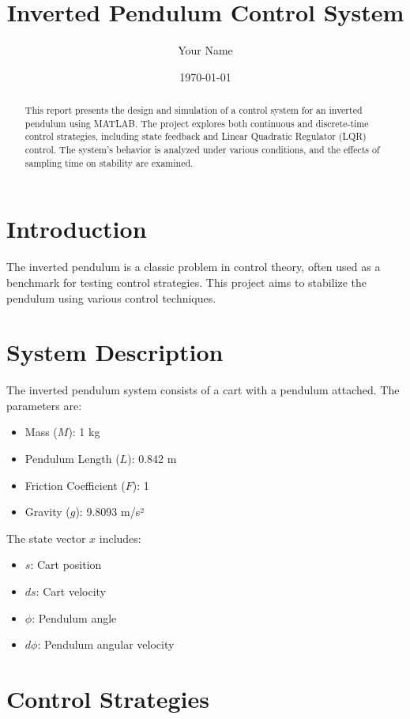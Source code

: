 \documentclass[a4paper, 12pt]{article}
\title{Inverted Pendulum Control System}
\author{Your Name}
\date{\today}
\begin{document}
\maketitle

\begin{abstract}
This report presents the design and simulation of a control system for an inverted pendulum using MATLAB. The project explores both continuous and discrete-time control strategies, including state feedback and Linear Quadratic Regulator (LQR) control. The system's behavior is analyzed under various conditions, and the effects of sampling time on stability are examined.
\end{abstract}

\tableofcontents

\section{Introduction}
The inverted pendulum is a classic problem in control theory, often used as a benchmark for testing control strategies. This project aims to stabilize the pendulum using various control techniques.

\section{System Description}
The inverted pendulum system consists of a cart with a pendulum attached. The parameters are:
\begin{itemize}
    \item Mass ($M$): 1 kg
    \item Pendulum Length ($L$): 0.842 m
    \item Friction Coefficient ($F$): 1
    \item Gravity ($g$): 9.8093 m/s²
\end{itemize}

The state vector $x$ includes:
\begin{itemize}
    \item $s$: Cart position
    \item $ds$: Cart velocity
    \item $\phi$: Pendulum angle
    \item $d\phi$: Pendulum angular velocity
\end{itemize}

\section{Control Strategies}
\end{document}

